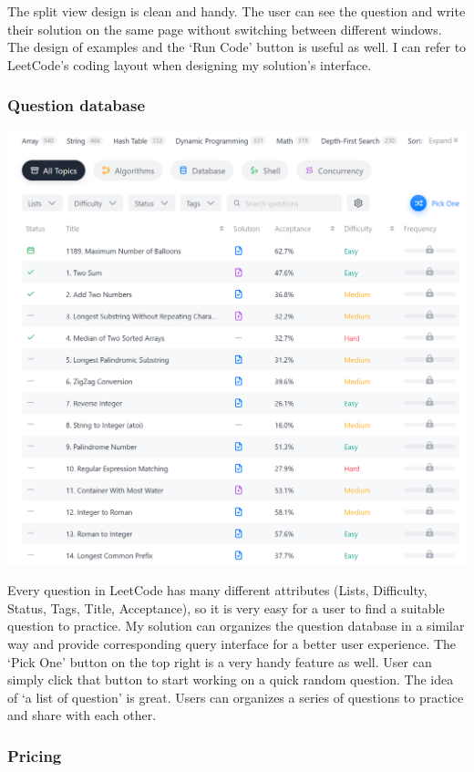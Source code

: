 \documentclass[a4paper]{report}
\begin{document}
The split view design is clean and handy. The user can see the question and write their solution on the same page without switching between different windows. The design of examples and the `Run Code' button is useful as well. I can refer to LeetCode's coding layout when designing my solution's interface.

\subsubsection{Question database}

\includegraphics[width=\linewidth]{LeetCode-Problems}

Every question in LeetCode has many different attributes (Lists, Difficulty, Status, Tags, Title, Acceptance), so it is very easy for a user to find a suitable question to practice. My solution can organizes the question database in a similar way and provide corresponding query interface for a better user experience. The `Pick One' button on the top right is a very handy feature as well. User can simply click that button to start working on a quick random question. The idea of `a list of question' is great. Users can organizes a series of questions to practice and share with each other.

\subsubsection{Pricing}
\end{document}
